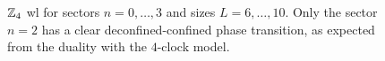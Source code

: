 \begin{figure}[t]
    \centering
    
    \vspace*{-10pt}
    \caption[\ac{wl}s for the $\Z_4$ ladder \ac{lgt}]{$\Z_4$ \ac{wl} for sectors $n=0, \dots, 3$ and sizes $L=6, \dots, 10$.
        Only the sector $n = 2$ has a clear deconfined-confined phase transition, as expected from the duality with the $4$-clock model.
    }
    \label{fig:z4_wilson}
\end{figure}



%
